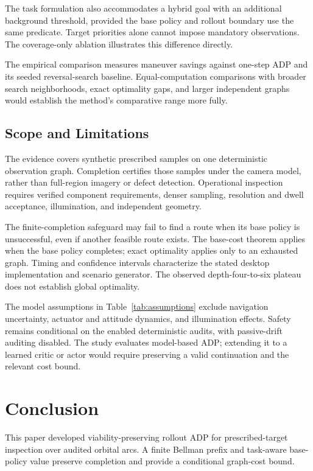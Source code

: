 \documentclass{IEEEtaes}
\theoremstyle{remark}
\theoremstyle{plain}
\begin{document}
The task formulation also accommodates a hybrid goal with an additional background threshold, provided the base policy and rollout boundary use the same predicate. Target priorities alone cannot impose mandatory observations. The coverage-only ablation illustrates this difference directly.

The empirical comparison measures maneuver savings against one-step ADP and its seeded reversal-search baseline. Equal-computation comparisons with broader search neighborhoods, exact optimality gaps, and larger independent graphs would establish the method's comparative range more fully.

\subsection{Scope and Limitations}

The evidence covers synthetic prescribed samples on one deterministic observation graph. Completion certifies those samples under the camera model, rather than full-region imagery or defect detection. Operational inspection requires verified component requirements, denser sampling, resolution and dwell acceptance, illumination, and independent geometry.

The finite-completion safeguard may fail to find a route when its base policy is unsuccessful, even if another feasible route exists. The base-cost theorem applies when the base policy completes; exact optimality applies only to an exhausted graph. Timing and confidence intervals characterize the stated desktop implementation and scenario generator. The observed depth-four-to-six plateau does not establish global optimality.

The model assumptions in Table~\ref{tab:assumptions} exclude navigation uncertainty, actuator and attitude dynamics, and illumination effects. Safety remains conditional on the enabled deterministic audits, with passive-drift auditing disabled. The study evaluates model-based ADP; extending it to a learned critic or actor would require preserving a valid continuation and the relevant cost bound.

\section{Conclusion}
\label{sec:conclusion}

This paper developed viability-preserving rollout ADP for prescribed-target inspection over audited orbital arcs. A finite Bellman prefix and task-aware base-policy value preserve completion and provide a conditional graph-cost bound.
\end{document}
